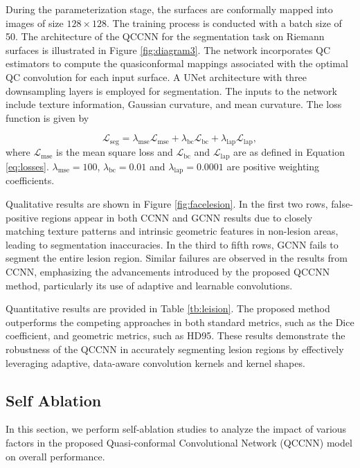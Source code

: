 During the parameterization stage, the surfaces are conformally mapped into images of size $128 \times 128$. The training process is conducted with a batch size of 50. The architecture of the QCCNN for the segmentation task on Riemann surfaces is illustrated in Figure \ref{fig:diagram3}. The network incorporates QC estimators to compute the quasiconformal mappings associated with the optimal QC convolution for each input surface. A UNet architecture with three downsampling layers is employed for segmentation. The inputs to the network include texture information, Gaussian curvature, and mean curvature. The loss function is given by

\begin{equation}\label{loss_seg}
    \mathcal{L}_\text{seg} = \lambda_\text{mse} \mathcal{L}_\text{mse} + \lambda_\text{bc} \mathcal{L}_\text{bc} + \lambda_\text{lap} \mathcal{L}_\text{lap},
\end{equation}
where $\mathcal{L}_\text{mse}$ is the mean square loss and $\mathcal{L}_\text{bc}$ and $\mathcal{L}_\text{lap}$ are as defined in Equation \ref{eq:losses}. $\lambda_\text{mse}=100$, $\lambda_\text{bc}=0.01$ and $\lambda_\text{lap}=0.0001$ are positive weighting coefficients.

Qualitative results are shown in Figure \ref{fig:facelesion}. In the first two rows, false-positive regions appear in both CCNN and GCNN results due to closely matching texture patterns and intrinsic geometric features in non-lesion areas, leading to segmentation inaccuracies. In the third to fifth rows, GCNN fails to segment the entire lesion region. Similar failures are observed in the results from CCNN, emphasizing the advancements introduced by the proposed QCCNN method, particularly its use of adaptive and learnable convolutions.

Quantitative results are provided in Table \ref{tb:leision}. The proposed method outperforms the competing approaches in both standard metrics, such as the Dice coefficient, and geometric metrics, such as HD95. These results demonstrate the robustness of the QCCNN in accurately segmenting lesion regions by effectively leveraging adaptive, data-aware convolution kernels and kernel shapes.

\subsection{Self Ablation}

In this section, we perform self-ablation studies to analyze the impact of various factors in the proposed Quasi-conformal Convolutional Network (QCCNN) model on overall performance.

